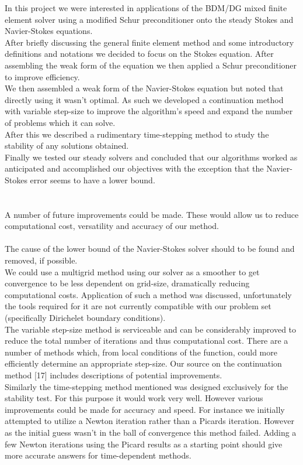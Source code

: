 \documentclass[11pt,twoside,a4paper]{article}
\begin{document}
In this project we were interested in applications of the BDM/DG mixed finite element solver using a modified Schur preconditioner onto the steady Stokes and Navier-Stokes equations.\\
After briefly discussing the general finite element method and some introductory definitions and notations we decided to focus on the Stokes equation. After assembling the weak form of the equation we then applied a Schur preconditioner to improve efficiency.\\
We then assembled a weak form of the Navier-Stokes equation but noted that directly using it wasn't optimal. As such we developed a continuation method with variable step-size to improve the algorithm's speed and expand the number of problems which it can solve.\\
After this we described a rudimentary time-stepping method to study the stability of any solutions obtained.\\
Finally we tested our steady solvers and concluded that our algorithms worked as anticipated and accomplished our objectives with the exception that the Navier-Stokes error seems to have a lower bound.\\
\\
\\
A number of future improvements could be made.
These would allow us to reduce computational cost, versatility and accuracy of our method.\\
\\
The cause of the lower bound of the Navier-Stokes solver should to be found and removed, if possible.\\
We could use a multigrid method using our solver as a smoother to get convergence to be less dependent on grid-size, dramatically reducing computational costs. Application of such a method was discussed, unfortunately the tools required for it are not currently compatible with our problem set (specifically Dirichelet boundary conditions).\\
The variable step-size method is serviceable and can be considerably improved to reduce the total number of iterations and thus computational cost. There are a number of methods which, from local conditions of the function, could more efficiently determine an appropriate step-size. Our source on the continuation method [17] includes descriptions of potential improvements.\\
Similarly the time-stepping method mentioned was designed exclusively for the stability test. For this purpose it would work very well. However various improvements could be made for accuracy and speed. For instance we initially attempted to utilize a Newton iteration rather than a Picards iteration. However as the initial guess wasn't in the ball of convergence this method failed. Adding a few Newton iterations using the Picard results as a starting point should give more accurate answers for time-dependent methods.\\
\end{document}
